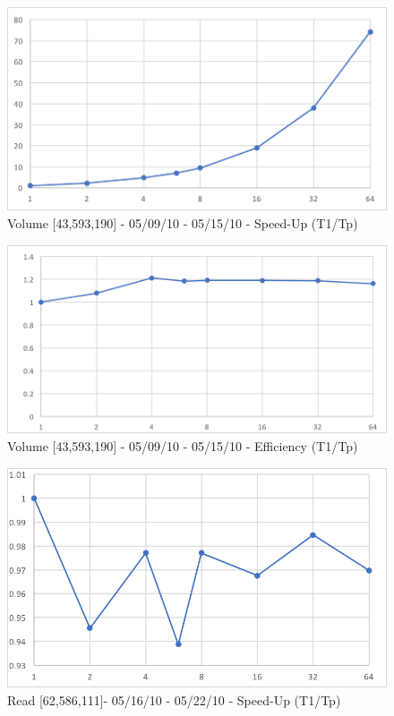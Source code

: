 \documentclass[12pt]{article} %
\begin{document}
\begin{figure}[htb]
\caption{Volume [43,593,190] - 05/09/10 - 05/15/10 - Speed-Up (T1/Tp)}\label{fig:benchmark01}
\centering
\includegraphics[width=15cm,keepaspectratio]{imgs/img05.png}
\end{figure} 

\begin{figure}[htb]
\caption{Volume [43,593,190] - 05/09/10 - 05/15/10 - Efficiency (T1/Tp)}\label{fig:benchmark01}
\centering
\includegraphics[width=15cm,keepaspectratio]{imgs/img06.png}
\end{figure} 


\begin{figure}[htb]
\caption{Read [62,586,111]- 05/16/10 - 05/22/10 - Speed-Up (T1/Tp)}\label{fig:benchmark01}
\centering
\includegraphics[width=15cm,keepaspectratio]{imgs/img07.png}
\end{figure} 
\end{document}
